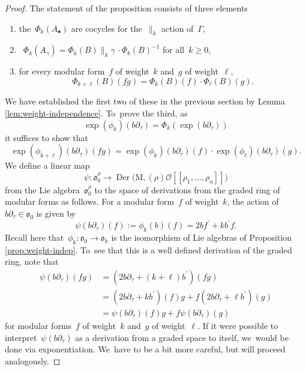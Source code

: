 \documentclass[JEP,XML,SOM,Unicode,published]{cedram}
\let\oldbullet\bullet
\renewcommand{\bullet}{{\scriptscriptstyle\oldbullet}}
\theoremstyle{plain}
\theoremstyle{definition}
\newcommand{\tx}{\text}
\newcommand{\cO}{\ensuremath{\mathcal{O}}}
\newcommand{\frako}{\ensuremath{\mathfrak{o}}}
\newcommand{\rmM}{\ensuremath{\mathrm{M}}}
\newcommand{\llbrkt}{[\![}
\newcommand{\rrbrkt}{]\!]}
\let\Ga\Gamma
\let\ga\gamma
\DeclareMathOperator{\Der}{Der}
\begin{document}
\begin{proof}
The statement of the proposition consists of three elements
\begin{enumerate}\renewcommand{\theenumi}{\roman{enumi}}
\item the~$\Phi_k(A_\bullet)$ are cocycles for the~$\big\|_k$ action of~$\Ga$,
\item~$\Phi_k(A_\ga) = \Phi_k(B)\big\|_k\gamma\,\cdot \Phi_k(B)^{-1}$ for all~$k\geq 0$,
\item for every modular form~$f$ of weight~$k$ and~$g$ of weight~$\ell$,
\begin{equation*}\Phi_{k+\ell}(B)(fg) = \Phi_k(B)(f)\cdot \Phi_\ell(B)(g).\end{equation*}
\end{enumerate}
We have established the first two of these in the previous section by Lemma \ref{lem:weight-independence}. To~prove the third, as
\begin{equation*}
\exp(\phi_k)(b\partial_\tau)= \Phi_k\left(\exp(b\partial_\tau)\right)
\end{equation*}
it suffices to show that
\begin{equation*}
\exp(\phi_{k+\ell})(b\partial_\tau)(fg) = \exp(\phi_k)(b\partial_\tau)(f)\cdot \exp(\phi_\ell)(b\partial_\tau)(g)
\tx{.}
\end{equation*}
We define a linear map
\begin{equation*}
\psi:\frako_0^\rho \to \Der\bigl(\rmM,(\rho)\cO\llbrkt \rho_1,\ldots,\rho_n\rrbrkt \bigr)
\end{equation*}
from the Lie algebra~$\frako_0^\rho$ to the space of derivations from the graded ring of modular forms as follows. For a modular form~$f$ of weight~$k$, the action of~$b\partial_\tau\in\frako_0$ is given by
\begin{equation*}\psi(b\partial_\tau)(f):= \phi_k(b)(f) = 2bf^\prime + kb^\prime f\tx{.}\end{equation*}
Recall here that~$\phi_k:\frako_0\to \frako_k$ is the isomorphism of Lie algebras of Proposition \ref{prop:weight-indep}. To~see that this is a well defined derivation of the graded ring, note that
\begin{equation}\label{eq:graded-derivation}
\begin{aligned}
\psi(b\partial_\tau)(fg) &= \left(2b\partial_\tau + (k+\ell)b^\prime\right)(fg)\\
&= \left(2b\partial_\tau + kb^\prime\right)(f)g + f\left(2b\partial_\tau + \ell b^\prime\right)(g)\\
&= \psi(b\partial_\tau)(f)g + f\psi(b\partial_\tau)(g)
\end{aligned}
\end{equation}
for modular forms~$f$ of weight~$k$ and~$g$ of weight~$\ell$. If it were possible to interpret~$\psi(b\partial_\tau)$ as a derivation from a graded space to itself, we~would be done via exponentiation. We~have to be a bit more careful, but will proceed analogously.


\end{proof}
\end{document}
